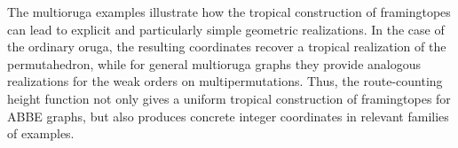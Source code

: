 \documentclass[12pt, reqno]{amsart}
\theoremstyle{plain}
\theoremstyle{definition}
\numberwithin{equation}{section}
\begin{document}
The multioruga examples illustrate how the tropical construction of framingtopes can lead to explicit and particularly simple geometric realizations. In the case of the ordinary oruga, the resulting coordinates recover a tropical realization of the permutahedron, while for general multioruga graphs they provide analogous realizations for the weak orders on multipermutations. Thus, the route-counting height function not only gives a uniform tropical construction of framingtopes for ABBE graphs, but also produces concrete integer coordinates in relevant families of examples.

\printbibliography 
\end{document}
